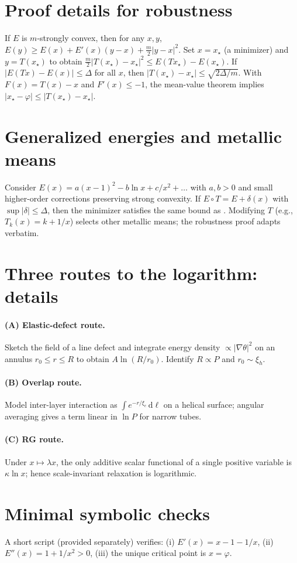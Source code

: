 \documentclass[11pt]{article}
\theoremstyle{remark}
\theoremstyle{definition}
\newcommand{\ph}{\varphi}
\begin{document}
\appendix
\section{Proof details for robustness}
If $E$ is $m$-strongly convex, then for any $x,y$, $E(y)\ge E(x)+E'(x)(y-x)+\tfrac{m}{2}|y-x|^2$. Set $x=x_\star$ (a minimizer) and $y=T(x_\star)$ to obtain $\tfrac{m}{2}|T(x_\star)-x_\star|^2\le E(Tx_\star)-E(x_\star)$. If $|E(Tx)-E(x)|\le\Delta$ for all $x$, then $|T(x_\star)-x_\star|\le \sqrt{2\Delta/m}$. With $F(x)=T(x)-x$ and $F'(x)\le-1$, the mean-value theorem implies $|x_\star-\ph|\le |T(x_\star)-x_\star|$.

\section{Generalized energies and metallic means}
Consider $E(x)=a(x-1)^2 - b\ln x + c/x^2 + \dots$ with $a,b>0$ and small higher-order corrections preserving strong convexity. If $E\circ T=E+\delta(x)$ with $\sup|\delta|\le\Delta$, then the minimizer satisfies the same bound as . Modifying $T$ (e.g., $T_k(x)=k+1/x$) selects other metallic means; the robustness proof adapts verbatim.

\section{Three routes to the logarithm: details}
\paragraph{(A) Elastic-defect route.} Sketch the field of a line defect and integrate energy density $\propto |\nabla\theta|^2$ on an annulus $r_0\le r\le R$ to obtain $A\ln(R/r_0)$. Identify $R\propto P$ and $r_0\sim \xi_h$.
\paragraph{(B) Overlap route.} Model inter-layer interaction as $\int e^{-r/\xi_c}\,\mathrm d\ell$ on a helical surface; angular averaging gives a term linear in $\ln P$ for narrow tubes.
\paragraph{(C) RG route.} Under $x\mapsto \lambda x$, the only additive scalar functional of a single positive variable is $\kappa\ln x$; hence scale-invariant relaxation is logarithmic.

\section{Minimal symbolic checks}
A short script (provided separately) verifies: (i) $E'(x)=x-1-1/x$, (ii) $E''(x)=1+1/x^2>0$, (iii) the unique critical point is $x=\ph$.


\end{document}
